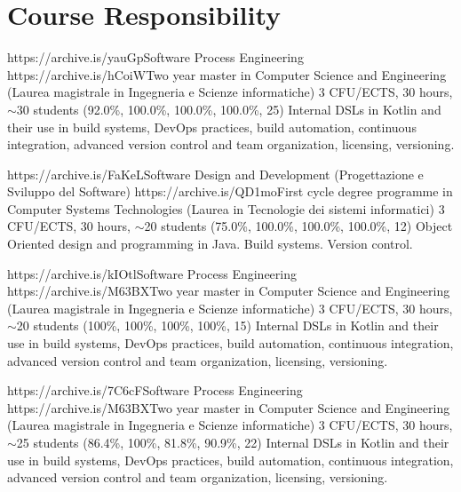 \section{Course Responsibility}
\vspace{-2em}
\begin{outerlist}
    \item[2025/26]
        \unibocourse
        {https://archive.is/yauGp}{Software Process Engineering}
        {https://archive.is/hCoiW}{Two year master in Computer Science and Engineering (Laurea magistrale in Ingegneria e Scienze informatiche)}
        {3 CFU/ECTS, 30 hours, $\sim$30 students}
        {(92.0\%, 100.0\%, 100.0\%, 100.0\%, 25)}
        {Internal DSLs in Kotlin and their use in build systems, DevOps practices, build automation, continuous integration, advanced version control and team organization, licensing, versioning.}
    \item[2025/26]
        \unibocourse
        {https://archive.is/FaKeL}{Software Design and Development (Progettazione e Sviluppo del Software)}
        {https://archive.is/QD1mo}{First cycle degree programme in Computer Systems Technologies (Laurea in Tecnologie dei sistemi informatici)}
        {3 CFU/ECTS, 30 hours, $\sim$20 students}
        {(75.0\%, 100.0\%, 100.0\%, 100.0\%, 12)}
        {Object Oriented design and programming in Java. Build systems. Version control.}
    \item[2024/25]
        \unibocourse
        {https://archive.is/kIOtl}{Software Process Engineering}
        {https://archive.is/M63BX}{Two year master in Computer Science and Engineering (Laurea magistrale in Ingegneria e Scienze informatiche)}
        {3 CFU/ECTS, 30 hours, $\sim$20 students}
        {(100\%, 100\%, 100\%, 100\%, 15)}
        {Internal DSLs in Kotlin and their use in build systems, DevOps practices, build automation, continuous integration, advanced version control and team organization, licensing, versioning.}
    \item[2023/24]
        \unibocourse
        {https://archive.is/7C6cF}{Software Process Engineering}
        {https://archive.is/M63BX}{Two year master in Computer Science and Engineering (Laurea magistrale in Ingegneria e Scienze informatiche)}
        {3 CFU/ECTS, 30 hours, $\sim$25 students}
        {(86.4\%, 100\%, 81.8\%, 90.9\%, 22)}
        {Internal DSLs in Kotlin and their use in build systems, DevOps practices, build automation, continuous integration, advanced version control and team organization, licensing, versioning.}
    \item[2022/23]

\end{outerlist}
